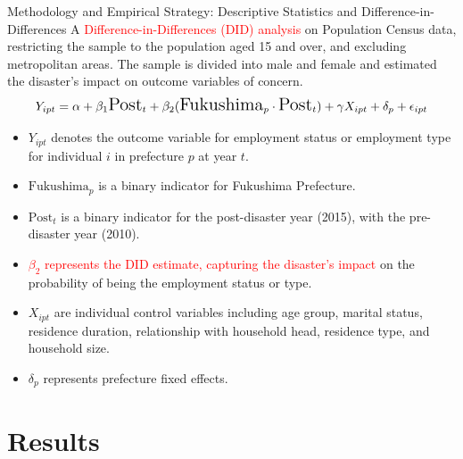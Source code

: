 \documentclass[serif, aspectratio=169]{beamer}
\begin{document}
\begin{frame}{Methodology and Empirical Strategy: Descriptive Statistics and  Difference-in-Differences}
\vspace{-0.2cm}
A \textcolor{red}{Difference-in-Differences (DID) analysis} on Population Census data, restricting the sample to the population aged 15 and over, and excluding metropolitan areas. The sample is divided into male and female and estimated the disaster's impact on outcome variables of concern.
\vspace{-0.1cm}
   \begin{equation}
   \Large Y_{ipt} = \alpha + \beta_1 \text{Post}_t + \beta_2 (\text{Fukushima}_p \cdot \text{Post}_t) + \gamma X_{ipt} + \delta_p + \epsilon_{ipt}
   \end{equation}
   \vspace{-0.5cm}
   \begin{itemize}
   \item $Y_{ipt}$ denotes the outcome variable for employment status or employment type for individual $i$ in prefecture $p$ at year $t$.
   \item $\text{Fukushima}_p$ is a binary indicator for Fukushima Prefecture.
   \item $\text{Post}_t$ is a binary indicator for the post-disaster year (2015), with the pre-disaster year (2010).
   \item \textcolor{red}{$\beta_2$ represents the DID estimate, capturing the disaster's impact} on the probability of being the employment status or type.
   \item $X_{ipt}$ are individual control variables including age group, marital status, residence duration, relationship with household head, residence type, and household size.
   \item $\delta_p$ represents prefecture fixed effects.
   \end{itemize}
\end{frame}

\section{Results}
\end{document}
